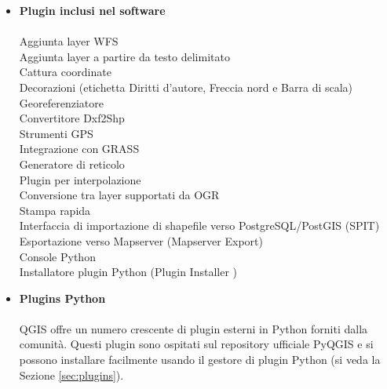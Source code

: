 \begin{itemize}
\item \textbf{Plugin inclusi nel software}
\\ \\ Aggiunta layer WFS
\\ Aggiunta layer a partire da testo delimitato
\\ Cattura coordinate
\\ Decorazioni (etichetta Diritti d'autore, Freccia nord e Barra di scala)
\\ Georeferenziatore
\\ Convertitore Dxf2Shp
\\ Strumenti GPS
\\ Integrazione con GRASS
\\ Generatore di reticolo
\\ Plugin per interpolazione
\\ Conversione tra layer supportati da OGR
\\ Stampa rapida
\\ Interfaccia di importazione di shapefile verso PostgreSQL/PostGIS (SPIT)
\\ Esportazione verso Mapserver (Mapserver Export)
\\ Console Python
\\ Installatore plugin Python (Plugin Installer )
\\ \item \textbf{Plugins Python}
\\ \\ QGIS offre un numero crescente di plugin esterni in Python forniti
dalla comunità. Questi plugin sono ospitati sul repository ufficiale
PyQGIS e si possono installare facilmente usando il gestore di
plugin Python (si veda la Sezione \ref{sec:plugins}).
\end{itemize}


